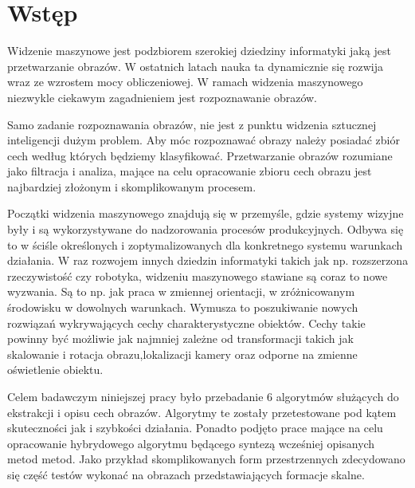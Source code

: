\chapter{Wstęp}
Widzenie maszynowe jest podzbiorem szerokiej dziedziny informatyki jaką jest przetwarzanie obrazów. W ostatnich latach nauka ta dynamicznie się rozwija wraz ze wzrostem mocy obliczeniowej. W ramach widzenia maszynowego niezwykle ciekawym zagadnieniem jest rozpoznawanie obrazów. 

Samo zadanie rozpoznawania obrazów, nie jest z punktu widzenia sztucznej inteligencji dużym problem. Aby móc rozpoznawać obrazy należy posiadać zbiór cech według których będziemy klasyfikować. Przetwarzanie obrazów rozumiane jako filtracja i analiza, mające na celu opracowanie zbioru cech obrazu jest najbardziej złożonym  i skomplikowanym procesem. 

Początki widzenia maszynowego znajdują się w przemyśle, gdzie systemy wizyjne były i są wykorzystywane do nadzorowania procesów produkcyjnych. Odbywa się to w ściśle określonych i zoptymalizowanych dla konkretnego systemu warunkach działania. W raz rozwojem innych dziedzin informatyki takich jak np. rozszerzona rzeczywistość czy robotyka, widzeniu maszynowego stawiane są coraz to nowe wyzwania. Są to np. jak praca w zmiennej orientacji, w zróżnicowanym środowisku w dowolnych warunkach. Wymusza to poszukiwanie nowych rozwiązań wykrywających cechy charakterystyczne obiektów. Cechy takie powinny być możliwie jak najmniej zależne od transformacji takich jak skalowanie i rotacja obrazu,lokalizacji kamery oraz odporne na zmienne oświetlenie obiektu. 

Celem badawczym niniejszej pracy było przebadanie 6 algorytmów służących do ekstrakcji i opisu cech obrazów. Algorytmy te zostały przetestowane pod kątem skuteczności jak i szybkości działania. Ponadto podjęto prace mające na celu opracowanie hybrydowego algorytmu będącego syntezą wcześniej opisanych metod metod. Jako przykład skomplikowanych form przestrzennych zdecydowano się część testów wykonać na obrazach przedstawiających formacje skalne.
